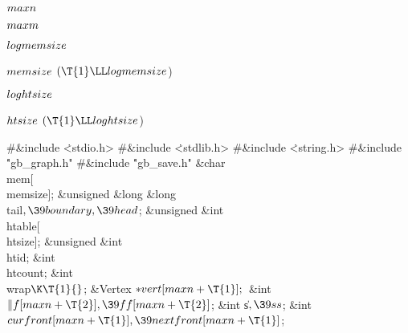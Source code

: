\Y\B\4\D$\\{maxn}$ \5
\par
\B\4\D$\\{maxm}$ \5
\par
\B\4\D$\\{logmemsize}$ \5
\par
\B\4\D$\\{memsize}$ \5
$(\T{1}\LL\\{logmemsize}{}$)\par
\B\4\D$\\{loghtsize}$ \5
\par
\B\4\D$\\{htsize}$ \5
$(\T{1}\LL\\{loghtsize}{}$)\par
\Y\B\8\#\&{include} \.{<stdio.h>}\6
\8\#\&{include} \.{<stdlib.h>}\6
\8\#\&{include} \.{<string.h>}\6
\8\#\&{include} \.{"gb\_graph.h"}\6
\8\#\&{include} \.{"gb\_save.h"}\6
\&{char} \\{mem}[\\{memsize}];\6
\&{unsigned} \&{long} \&{long} \\{tail}${},\39\\{boundary},\39\\{head}{}$;\6
\&{unsigned} \&{int} \\{htable}[\\{htsize}];\6
\&{unsigned} \&{int} \\{htid};\6
\&{int} \\{htcount};\6
\&{int} \\{wrap}${}\K\T{1}{}$;\6
\&{Vertex} ${}{*}\\{vert}[\\{maxn}+\T{1}];{}$\6
\&{int} ${}\|f[\\{maxn}+\T{2}],\39\\{ff}[\\{maxn}+\T{2}]{}$;\6
\&{int} \|s${},\39\\{ss}{}$;\6
\&{int} ${}\\{curfront}[\\{maxn}+\T{1}],\39\\{nextfront}[\\{maxn}+\T{1}]{}$;\6
